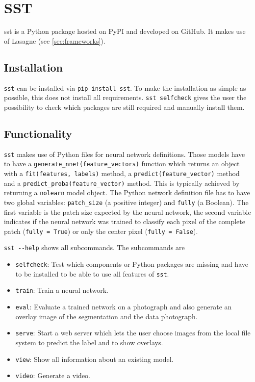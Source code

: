 
\section{SST}\label{sec:sst}
\Gls{sst} is a Python package hosted on \gls{PyPI} and developed on GitHub. It
makes use of Lasagne (see \cref{sec:frameworks}).

\subsection{Installation}
\verb+sst+ can be installed via \verb+pip install sst+. To make the
installation as simple as possible, this does not install all requirements.
\verb+sst selfcheck+ gives the user the possibility to check which packages
are still required and manually install them.

\subsection{Functionality}
\verb+sst+ makes use of Python files for neural network definitions. Those
models have to have a \verb+generate_nnet(feature_vectors)+ function which
returns an object with a \verb+fit(features, labels)+ method, a
\verb+predict(feature_vector)+ method and a
\verb+predict_proba(feature_vector)+ method. This is typically achieved by
returning a \verb+nolearn+ model object. The Python network definition file
has to have two global variables: \verb+patch_size+ (a positive integer) and
\verb+fully+ (a Boolean). The first variable is the patch size expected by the
neural network, the second variable indicates if the neural network was trained
to classify each pixel of the complete patch (\verb+fully = True+) or only the
center pixel (\verb+fully = False+).

\verb+sst --help+ shows all subcommands. The subcommands are

\begin{itemize}
    \item \verb+selfcheck+: Test which components or Python packages are
                            missing and have to be installed to be able to use
                            all features of \verb+sst+.
    \item \verb+train+: Train a neural network.
    \item \verb+eval+: Evaluate a trained network on a photograph and also
                       generate an overlay image of the segmentation and the
                       data photograph.
    \item \verb+serve+: Start a web server which lets the user choose images
                        from the local file system to predict the label and to
                        show overlays.
    \item \verb+view+: Show all information about an existing model.
    \item \verb+video+: Generate a video.
\end{itemize}